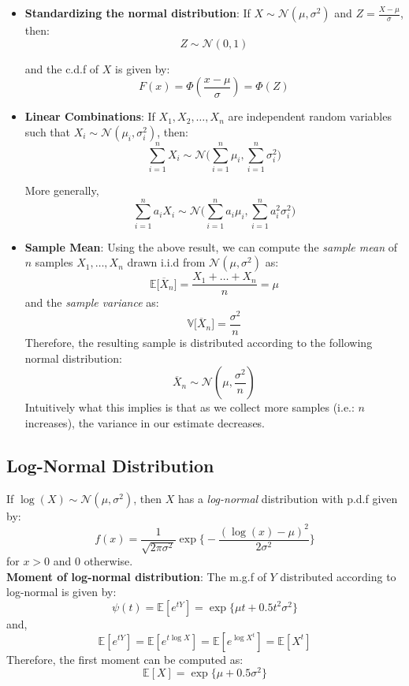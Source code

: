 \documentclass[english, 11pt]{article}
\begin{document}
\begin{itemize}
\item {\bf Standardizing the normal distribution}: If $X \sim \mathcal{N} (\mu, \sigma^2)$ and $Z = \frac{X-\mu}{\sigma}$, then:
\[ Z \sim \mathcal{N} (0, 1) \] 

and the c.d.f of $X$ is given by:
\[ F(x) = \Phi(\frac{x-\mu}{\sigma}) = \Phi(Z) \]

\item {\bf Linear Combinations}: If $X_1, X_2, \ldots, X_n$ are independent random variables such that $X_i \sim \mathcal{N} (\mu_i, \sigma_i^2)$, then:
\[ \sum_{i=1}^{n} X_i \sim \mathcal{N} \bigg(\sum_{i=1}^{n} \mu_i, \sum_{i=1}^{n} \sigma_i^2 \bigg) \]

More generally,
\[ \sum_{i=1}^{n} a_i X_i \sim \mathcal{N} \bigg( \sum_{i=1}^{n} a_i \mu_i, \sum_{i=1}^{n} a_i^2 \sigma_i^2 \bigg) \]

\item {\bf Sample Mean}: Using the above result, we can compute the {\it sample mean} of $n$ samples $X_1, \ldots, X_n$ drawn i.i.d from $\mathcal{N} (\mu, \sigma^2)$ as:
\[ \mathbb{E} \big[ \overline{X}_n \big] = \frac{X_1 + \ldots + X_n}{n} = \mu \]
and the {\it sample variance} as:
\[ \mathbb{V} \big[ \overline{X}_n \big] = \frac{\sigma^2}{n} \]
Therefore, the resulting sample is distributed according to the following normal distribution:
\[ \overline{X}_n \sim \mathcal{N} (\mu, \frac{\sigma^2}{n}) \]
Intuitively what this implies is that as we collect more samples (i.e.: $n$ increases), the variance in our estimate decreases.
\end{itemize}

\subsection{Log-Normal Distribution}
If $\log(X) \sim \mathcal{N} (\mu, \sigma^2)$, then $X$ has a {\it log-normal} distribution with p.d.f given by:
\[ f(x) = \frac{1}{\sqrt{2 \pi \sigma^2}} \exp \bigg\{ - \frac{(\log(x) - \mu)^2}{2 \sigma^2} \bigg\} \]
for $x > 0$ and 0 otherwise. \\

{\bf Moment of log-normal distribution}: The m.g.f of $Y$ distributed according to log-normal is given by:
\[ \psi(t) = \mathbb{E}[e^{tY}] = \exp\{ \mu t + 0.5 t^2 \sigma^2 \} \]
and, \[ \mathbb{E}[e^{tY}] = \mathbb{E}[e^{t \log X}] = \mathbb{E}[e^{\log X^t}] = \mathbb{E}[X^t] \]
Therefore, the first moment can be computed as: \[ \mathbb{E}[X] = \exp \{ \mu + 0.5 \sigma^2 \} \]
\end{document}

